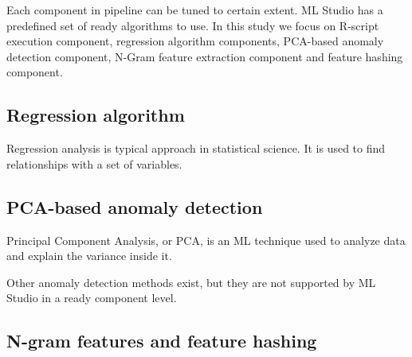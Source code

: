 Each component in pipeline can be tuned
to certain extent.
ML Studio has a predefined set of ready algorithms to use.
In this study we focus on  %
R-script execution component,
regression algorithm components,
PCA-based anomaly detection component,
N-Gram feature extraction component and
feature hashing component.



\subsection{Regression algorithm}\label{subsec:bg-regression-ml}
Regression analysis is typical approach in statistical science.
It is used to find relationships with a set of variables.


\subsection{PCA-based anomaly detection}\label{subsec:bg-pca-ada}



Principal Component Analysis, or PCA,
is an ML technique used to analyze data and explain the variance inside it.

Other anomaly detection methods exist, but they are not supported by ML Studio
in a ready component level. %


\subsection{N-gram features and feature hashing}\label{subsec:bg-ngram-features}

